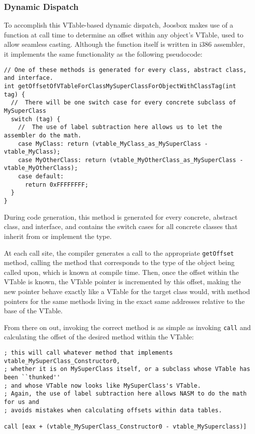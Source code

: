 \documentclass[letterpaper]{article}
\begin{document}
  \subsubsection{Dynamic Dispatch}

  To accomplish this VTable-based dynamic dispatch, Joosbox makes use of a function at call
  time to determine an offset within any object's VTable, used to allow seamless casting. Although
  the function itself is written in i386 assembler, it implements the same functionality as the following
  pseudocode:

  \begin{verbatim}
// One of these methods is generated for every class, abstract class, and interface.
int getOffsetOfVTableForClassMySuperClassForObjectWithClassTag(int tag) {
  //  There will be one switch case for every concrete subclass of MySuperClass
  switch (tag) {
    //  The use of label subtraction here allows us to let the assembler do the math.
    case MyClass: return (vtable_MyClass_as_MySuperClass - vtable_MyClass);
    case MyOtherClass: return (vtable_MyOtherClass_as_MySuperClass - vtable_MyOtherClass);
    case default:
      return 0xFFFFFFFF;
  }
}
  \end{verbatim}


  During code generation, this method is generated for every concrete, abstract class, and interface,
  and contains the switch cases for all concrete classes that inherit from or implement the type.

  At each call site, the compiler generates a call to the appropriate {\tt getOffset} method,
  calling the method that corresponds to the type of the object being called upon, which is known at compile
  time. Then, once the offset within the VTable is known, the VTable pointer is incremented by this offset,
  making the new pointer behave exactly like a VTable for the target class would, with method pointers for
  the same methods living in the exact same addresses relative to the base of the VTable.

  From there on out, invoking the correct method is as simple as invoking {\tt call} and
  calculating the offset of the desired method within the VTable:

  \begin{verbatim}
; this will call whatever method that implements vtable_MySuperClass_Constructor0,
; whether it is on MySuperClass itself, or a subclass whose VTable has been ``thunked''
; and whose VTable now looks like MySuperClass's VTable.
; Again, the use of label subtraction here allows NASM to do the math for us and
; avoids mistakes when calculating offsets within data tables.

call [eax + (vtable_MySuperClass_Constructor0 - vtable_MySuperclass)]
  \end{verbatim}
\end{document}
